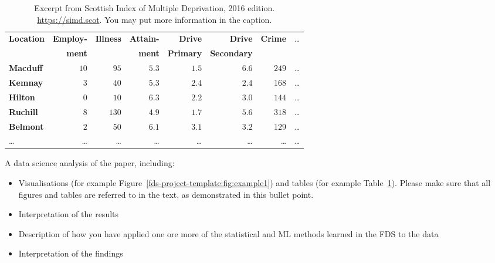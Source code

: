 \documentclass[11pt,a4paper]{article}
\begin{document}
        \begin{table}[b]
            \centering
            \caption{Excerpt from Scottish Index of Multiple Deprivation, 2016 edition.
                \url{https://simd.scot}.
                You may put more information in the caption.
            }
            \label{tab:example1}
            \begin{tabular}{lrrrrrrr}
                \hline\hline
                \textbf{Location} & \textbf{Employ-} & \textbf{Illness} & \textbf{Attain-} & \textbf{Drive}   & \textbf{Drive}     & \textbf{Crime} & \dots                \\
                                  & \textbf{ment}    &                  & \textbf{ment}    & \textbf{Primary} & \textbf{Secondary} &                &                      \\
                \hline
                \textbf{Macduff}  & $10$             & $ 95$            & $5.3$            & $1.5$            & $6.6$              & $249$          & \dots\tabularnewline
                \textbf{Kemnay}   & $ 3$             & $ 40$            & $5.3$            & $2.4$            & $2.4$              & $168$          & \dots\tabularnewline
                \textbf{Hilton}   & $ 0$             & $ 10$            & $6.3$            & $2.2$            & $3.0$              & $144$          & \dots\tabularnewline
                \textbf{Ruchill}  & $ 8$             & $130$            & $4.9$            & $1.7$            & $5.6$              & $318$          & \dots\tabularnewline
                \textbf{Belmont}  & $ 2$             & $ 50$            & $6.1$            & $3.1$            & $3.2$              & $129$          & \dots\tabularnewline
                \dots             & \dots            & \dots            & \dots            & \dots            & \dots              & \dots          & \dots\tabularnewline
                \hline
            \end{tabular}
        \end{table}

        A data science analysis of the paper, including: \begin{itemize} \item
            Visualisations (for example Figure~\ref{fds-project-template:fig:example1}) and
            tables (for example Table~\ref{tab:example1}).
        Please make sure that all figures and tables are referred to in the text, as
            demonstrated in this bullet point.
        \item Interpretation of the results
        \item Description of how you have applied one ore more of the
        statistical and ML methods learned in the FDS to the data
        \item Interpretation of the findings
        \end{itemize}
\end{document}
